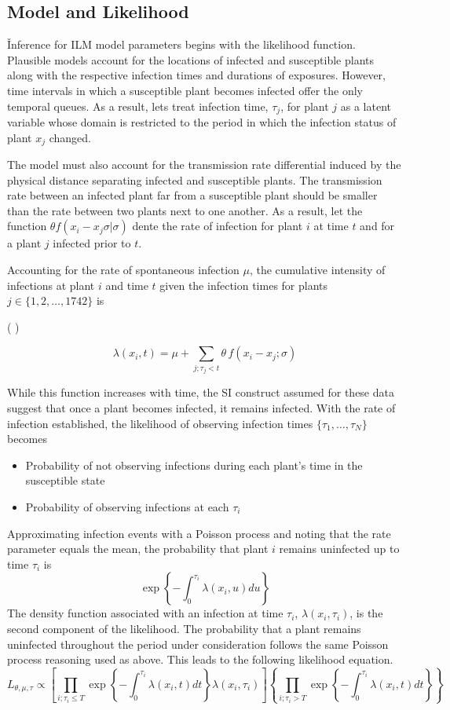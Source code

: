 \documentclass{uwstat572}
\newcommand{\vmadd}[1]{\textbf{\color{red}{#1}}}
\newcommand{\vmcomment}[1]{({\color{blue}{VM's comment:}} \textbf{\color{blue}{#1}})}
\begin{document}
\subsection{Model and Likelihood}
\v
Inference for ILM model parameters begins with the likelihood function. 
Plausible models account for the locations of infected and susceptible plants along with the respective infection times and durations of exposures. 
However, time intervals in which a susceptible plant becomes infected offer the only temporal queues. 
As a result, lets treat infection time, $\tau_j$, for plant $j$ as a latent variable whose domain is restricted to the period in which the infection status of plant $x_j$ changed. 

The model must also account for the transmission rate differential induced by the physical distance separating infected and susceptible plants. 
The transmission rate between an infected plant far from a susceptible plant should be smaller than the rate between two plants next to one another.
As a result, let the function $\theta f(x_i -x_j \sigma | \sigma)$ dente the rate of infection for plant $i$ at time $t$ and for a plant $j$ infected prior to $t$. 

Accounting for the rate of spontaneous infection $\mu$, the cumulative intensity of infections at plant $i$ and time $t$ given the infection times for plants $j \in \{1, 2, \dots, 1742\}$ is 

\vmcomment{Try to rewrite it now with CTMC generating process.}

$$ \lambda(x_i,t) = \mu + \sum_{j; \tau_j<t} \theta \, f(x_i - x_j; \sigma)$$\vmadd{.}

While this function increases with time, the SI construct assumed for these data suggest that once a plant becomes infected, it remains infected. 
With the rate of infection established, the likelihood of observing infection times $\{\tau_1, \dots, \tau_N\}$ becomes
\begin{itemize}
\item Probability of not observing infections during each plant's time in the susceptible state 
\item Probability of observing infections at each $\tau_i$
\end{itemize}
Approximating infection events with a Poisson process and noting that the rate parameter equals the mean, the probability that plant $i$ remains uninfected up to time $\tau_i$ is 
$$ \exp \left\{- \int^{\tau_i}_{0} \lambda(x_i, u) du \right\}$$
The density function associated with an infection at time $\tau_i$, $\lambda(x_i, \tau_i)$, is the second component of the likelihood. 
The probability that a plant remains uninfected throughout the period under consideration follows the same Poisson process reasoning used as above. 
This leads to the following likelihood equation. 
\begin{equation} L_{\theta, \mu, \tau} \propto \left[ \prod_{i;\tau_i \le T} \exp \left\{-\int^{\tau_i}_0 \lambda(x_i, t)dt\right \} \lambda(x_i, \tau_i)\right] \left\{ \prod_{i;\tau_i > T} \exp \left\{-\int^{\tau_i}_0 \lambda(x_i, t)dt\right \}\right\} \end{equation}
\end{document}
